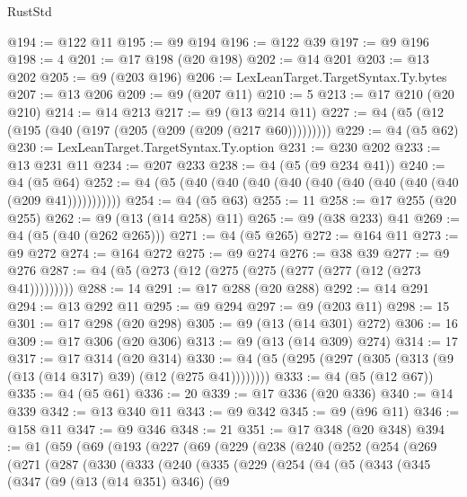 \begin{lexlean}{RustStd}
\begin{coremodule}
@194 := @122 @11
@195 := @9 @194
@196 := @122 @39
@197 := @9 @196
@198 := 4
@201 := @17 @198 (@20 @198)
@202 := @14 @201
@203 := @13 @202
@205 := @9 (@203 @196)
@206 := LexLeanTarget.TargetSyntax.Ty.bytes
@207 := @13 @206
@209 := @9 (@207 @11)
@210 := 5
@213 := @17 @210 (@20 @210)
@214 := @14 @213
@217 := @9 (@13 @214 @11)
@227 := @4 (@5 (@12 (@195 (@40 (@197 (@205 (@209 (@209 (@217 @60)))))))))
@229 := @4 (@5 @62)
@230 := LexLeanTarget.TargetSyntax.Ty.option
@231 := @230 @202
@233 := @13 @231 @11
@234 := @207 @233
@238 := @4 (@5 (@9 @234 @41))
@240 := @4 (@5 @64)
@252 := @4 (@5 (@40 (@40 (@40 (@40 (@40 (@40 (@40 (@40 (@40 (@209 @41)))))))))))
@254 := @4 (@5 @63)
@255 := 11
@258 := @17 @255 (@20 @255)
@262 := @9 (@13 (@14 @258) @11)
@265 := @9 (@38 @233) @41
@269 := @4 (@5 (@40 (@262 @265)))
@271 := @4 (@5 @265)
@272 := @164 @11
@273 := @9 @272
@274 := @164 @272
@275 := @9 @274
@276 := @38 @39
@277 := @9 @276
@287 := @4 (@5 (@273 (@12 (@275 (@275 (@277 (@277 (@12 (@273 @41)))))))))
@288 := 14
@291 := @17 @288 (@20 @288)
@292 := @14 @291
@294 := @13 @292 @11
@295 := @9 @294
@297 := @9 (@203 @11)
@298 := 15
@301 := @17 @298 (@20 @298)
@305 := @9 (@13 (@14 @301) @272)
@306 := 16
@309 := @17 @306 (@20 @306)
@313 := @9 (@13 (@14 @309) @274)
@314 := 17
@317 := @17 @314 (@20 @314)
@330 := @4 (@5 (@295 (@297 (@305 (@313 (@9 (@13 (@14 @317) @39) (@12 (@275 @41))))))))
@333 := @4 (@5 (@12 @67))
@335 := @4 (@5 @61)
@336 := 20
@339 := @17 @336 (@20 @336)
@340 := @14 @339
@342 := @13 @340 @11
@343 := @9 @342
@345 := @9 (@96 @11)
@346 := @158 @11
@347 := @9 @346
@348 := 21
@351 := @17 @348 (@20 @348)
@394 := @1
    (@59
      (@69
        (@193
          (@227
            (@69
              (@229
                (@238
                  (@240
                    (@252
                      (@254
                        (@269
                          (@271
                            (@287
                              (@330
                                (@333
                                  (@240
                                    (@335
                                      (@229
                                        (@254
                                          (@4
                                            (@5
                                              (@343
                                                (@345
                                                  (@347
                                                    (@9
                                                      (@13 (@14 @351) @346)
                                                      (@9

\end{coremodule}
\end{lexlean}

